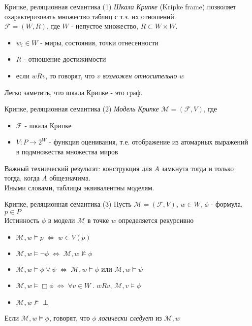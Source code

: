 \documentclass{beamer}
\begin{document}
\begin{frame}{Крипке, реляционная семантика (1)}
\textit{Шкала Крипке} (Kripke frame) позволяет охарактеризовать множество таблиц с т.з. их отношений.\\
\bigskip
$\mathcal{F} = (W, R)$, где $W$ - непустое множество, $R \subset W \times W$.\\
\bigskip
\begin{itemize}
  \item $w_i \in W$ - миры, состояния, точки отнесенности
  \item $R$ - отношение достижимости
  \item если $wRv$, то говорят, что $v$ \textit{возможен относительно} $w$
\end{itemize}
\bigskip
Легко заметить, что шкала Крипке - это граф.
\end{frame}

\begin{frame}{Крипке, реляционная семантика (2)}
\textit{Модель Крипке} $\mathcal{M} = (\mathcal{F}, V)$, где  
\bigskip
\begin{itemize}
  \item $\mathcal{F}$ - шкала Крипке
  \item $V : P \to 2^W$ - функция оценивания, т.е. отображение из атомарных выражений в подмножества множества миров
\end{itemize}
\bigskip
Важный технический результат: конструкция для $A$ замкнута тогда и только тогда, когда $A$ общезначима.\\
\bigskip
Иными словами, таблицы эквивалентны моделям.
\end{frame}

\begin{frame}{Крипке, реляционная семантика (3)}
Пусть $\mathcal{M} = (\mathcal{F}, V)$, $w \in W$, $\phi$ - формула, $p \in P$\\
\bigskip
Истинность $\phi$ в модели $\mathcal{M}$ в точке $w$ определяется рекурсивно\\
\bigskip
\begin{itemize}
  \item $\mathcal{M}, w \models p \; \Longleftrightarrow \; w \in V(p)$
  \item $\mathcal{M}, w \models \neg \phi \; \Longleftrightarrow \; \mathcal{M}, w \not\models \phi$
  \item $\mathcal{M}, w \models \phi \vee \psi \; \Longleftrightarrow \; \mathcal{M}, w \models \phi$ или $\mathcal{M}, w \models \psi$
  \item $\mathcal{M}, w \models \Box \phi \; \Longleftrightarrow \; \forall v \in W \; . \; w R v$, $\mathcal{M}, v \models \phi$
  \item $\mathcal{M}, w \not\models \perp$
\end{itemize}
\bigskip
Если $\mathcal{M}, w \models \phi$, говорят, что $\phi$ \textit{логически следует} из $\mathcal{M}, w$
\end{frame}
\end{document}
